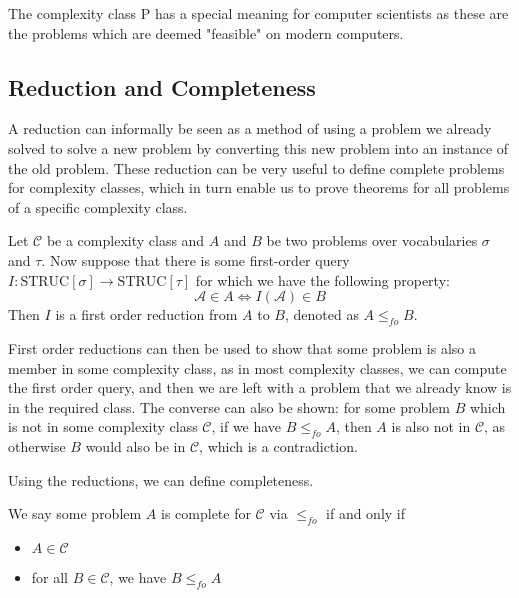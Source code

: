The complexity class P has a special meaning for computer scientists as these are the problems which are deemed "feasible" on modern computers.

\subsection{Reduction and Completeness}\label{subsec:reduction}

A reduction can informally be seen as a method of using a problem we already solved to solve a new problem by converting this new problem into an instance of the old problem.
These reduction can be very useful to define complete problems for complexity classes, which in turn enable us to prove theorems for all problems of a specific complexity class.

\begin{define}
    Let $\mathcal{C}$ be a complexity class and $A$ and $B$ be two problems over vocabularies $\sigma$ and $\tau$.
    Now suppose that there is some first-order query $I: \text{STRUC}[\sigma] \to \text{STRUC}[\tau]$ for which we have the following property:
    \[
        \mathcal{A} \in A \Leftrightarrow I(\mathcal{A}) \in B
    \]
    Then $I$ is a first order reduction from $A$ to $B$, denoted as $A \leq_{fo} B$.
\end{define}

First order reductions can then be used to show that some problem is also a member in some complexity class, as in most complexity classes, we can compute the first order query, and then we are left with a problem that we already know is in the required class.
The converse can also be shown: for some problem $B$ which is not in some complexity class $\mathcal{C}$, if we have $B \leq_{fo} A$, then $A$ is also not in $\mathcal{C}$, as otherwise $B$ would also be in $\mathcal{C}$, which is a contradiction.

Using the reductions, we can define completeness.

\begin{define}
    We say some problem $A$ is complete for $\mathcal{C}$ via $\leq_{fo}$ if and only if
    \begin{itemize}
        \setlength\itemsep{0.2em}
        \item $A \in \mathcal{C}$
        \item for all $B \in \mathcal{C}$, we have $B \leq_{fo} A$
    \end{itemize}
\end{define}

